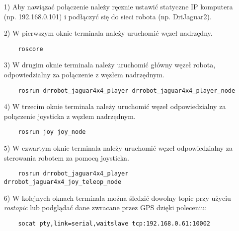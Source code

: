 \begin{enumerate}
\item[1)] Aby nawiązać połączenie należy ręcznie ustawić statyczne IP komputera (np. 192.168.0.101) i podłączyć się do sieci robota (np. DriJaguar2).
\item[2)] W pierwszym oknie terminala należy uruchomić węzeł nadrzędny.
	\begin{verbatim}
	roscore
	\end{verbatim}
\item[3)] W drugim oknie terminala należy uruchomić główny węzeł robota, odpowiedzialny za połączenie z węzłem nadrzędnym.
	\begin{verbatim}
	rosrun drrobot_jaguar4x4_player drrobot_jaguar4x4_player_node
	\end{verbatim}
\item[4)] W trzecim oknie terminala należy uruchomić węzeł odpowiedzialny za połączenie joysticka z węzłem nadrzędnym.
	\begin{verbatim}
	rosrun joy joy_node
	\end{verbatim}
\item[5)] W czwartym oknie terminala należy uruchomić węzeł odpowiedzialny za sterowania robotem za pomocą joysticka.
	\begin{verbatim}
	rosrun drrobot_jaguar4x4_player drrobot_jaguar4x4_joy_teleop_node
	\end{verbatim}
\item[6)] W kolejnych oknach terminala można śledzić dowolny topic przy użyciu \textit{rostopic} lub podglądać dane zwracane przez GPS dzięki poleceniu:
	\begin{verbatim}
	socat pty,link=serial,waitslave tcp:192.168.0.61:10002
	\end{verbatim}
\end{enumerate}
